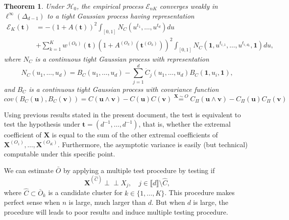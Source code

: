 \documentclass[11pt]{article}
\newtheorem{theorem}{Theorem}
\newcommand{\indep}{\perp \!\!\! \perp}
\begin{document}
	\begin{theorem}
		\label{thm:weak_conv}
		Under $\mathcal{H}_0$, the empirical process $\mathcal{E}_{nK}$ converges weakly in $\ell^{\infty}(\Delta_{d-1})$ to a tight Gaussian process having representation
		\begin{align*}
			\mathcal{E}_K(\textbf{t}) &= -\left(1+A(\textbf{t})\right)^2 \int_{[0,1]} N_C(u^{t_1}, \dots, u^{t_d})du \\ &+ \sum_{k=1}^K w^{(O_k)}(\textbf{t})\left(1+A^{(O_k)}(\textbf{t}^{(O_k)})\right)^2 \int_{[0,1]} N_C(\textbf{1},u^{t_{i,1}}, \dots, u^{t_{i,d_k}}, \textbf{1})du,
		\end{align*}
		where $N_C$ is a continuous tight Gaussian process with representation 
		\begin{equation*}
			N_C(u_1,\dots,u_d) = B_C(u_1, \dots, u_d) - \sum_{j=1}^d \dot{C}_j(u_1, \dots, u_d) B_C(\textbf{1}, u_i, \textbf{1}),
		\end{equation*}
		and $B_C$ is a continuous tight Gaussian process with covariance function
		\begin{equation*}
			cov(B_C(\textbf{u}), B_C(\textbf{v})) = C(\textbf{u} \wedge \textbf{v}) - C(\textbf{u})C(\textbf{v}) \overset{\textbf{X}\sim O}{=} C_{\Pi}(\textbf{u} \wedge \textbf{v}) - C_{\Pi}(\textbf{u})C_{\Pi}(\textbf{v})
		\end{equation*}
	\end{theorem}
	Using previous results stated in the present document, the test is equivalent to test the hypothesis under $\textbf{t} = (d^{-1},\dots,d^{-1})$, that is, whether the extremal coefficient of $\textbf{X}$ is equal to the sum of the other extremal coefficients of $\textbf{X}^{(O_1)}, \dots, \textbf{X}^{(O_K)}$. Furthermore, the asymptotic variance is easily (but technical) computable under this specific point.
	
	We can estimate $\bar{O}$ by applying a multiple test procedure by testing if
	\begin{equation}
		\textbf{X}^{(\hat{C})} \indep X_j, \quad j \in \llbracket d \rrbracket \setminus \hat{C},
	\end{equation}	 
	where $\hat{C} \subset \bar{O}_k$ is a candidate cluster for $k \in \{1,\dots,K\}$. This procedure makes perfect sense when $n$ is large, much larger than $d$. But when $d$ is large, the procedure will leads to poor results and induce multiple testing procedure.
	
\end{document}
